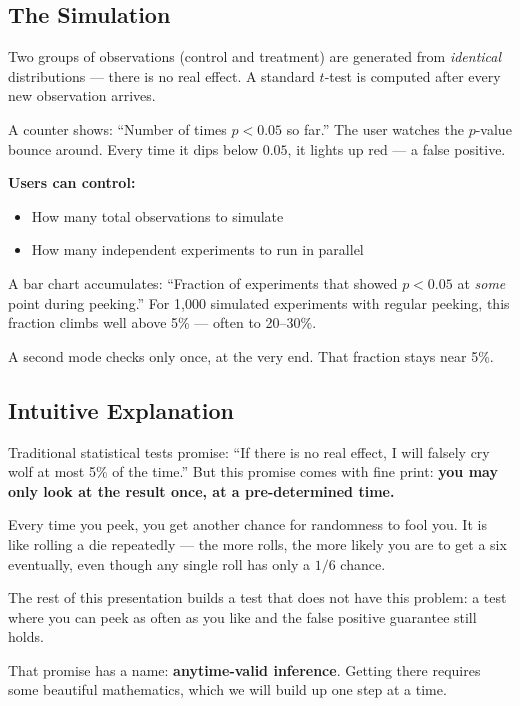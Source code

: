 \documentclass[12pt, a4paper]{article}
\begin{document}
\subsection{The Simulation}

\begin{simulation}
Two groups of observations (control and treatment) are generated from
\emph{identical} distributions --- there is no real effect.  A standard
$t$-test is computed after every new observation arrives.

A counter shows: ``Number of times $p<0.05$ so far.''  The user watches the
$p$-value bounce around.  Every time it dips below $0.05$, it lights up red ---
a false positive.

\textbf{Users can control:}
\begin{itemize}[nosep]
  \item How many total observations to simulate
  \item How many independent experiments to run in parallel
\end{itemize}

A bar chart accumulates: ``Fraction of experiments that showed $p<0.05$ at
\emph{some} point during peeking.''  For 1,000 simulated experiments with
regular peeking, this fraction climbs well above 5\% --- often to 20--30\%.

A second mode checks only once, at the very end.  That fraction stays near 5\%.
\end{simulation}

\subsection{Intuitive Explanation}

\begin{intuition}
Traditional statistical tests promise: ``If there is no real effect, I will
falsely cry wolf at most 5\% of the time.''  But this promise comes with fine
print: \textbf{you may only look at the result once, at a pre-determined time.}

Every time you peek, you get another chance for randomness to fool you.  It is
like rolling a die repeatedly --- the more rolls, the more likely you are to
get a six eventually, even though any single roll has only a $1/6$ chance.

The rest of this presentation builds a test that does not have this problem:
a test where you can peek as often as you like and the false positive guarantee
still holds.

That promise has a name: \textbf{anytime-valid inference}.  Getting there
requires some beautiful mathematics, which we will build up one step at a
time.
\end{intuition}
\end{document}
